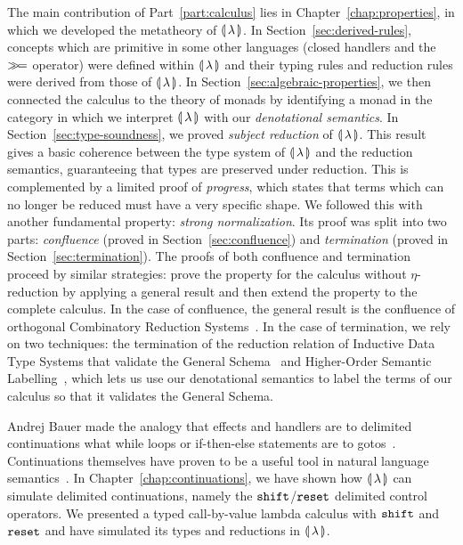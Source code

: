 The main contribution of Part~\ref{part:calculus} lies in
Chapter~\ref{chap:properties}, in which we developed the metatheory of
${\llparenthesis \, \lambda \, \rrparenthesis}$. In Section~\ref{sec:derived-rules}, concepts which are primitive
in some other languages (closed handlers and the $\mathbin{\gg\!=}$ operator) were
defined within ${\llparenthesis \, \lambda \, \rrparenthesis}$ and their typing rules and reduction rules were
derived from those of ${\llparenthesis \, \lambda \, \rrparenthesis}$. In Section~\ref{sec:algebraic-properties},
we then connected the calculus to the theory of monads by identifying a
monad in the category in which we interpret ${\llparenthesis \, \lambda \, \rrparenthesis}$ with our
\emph{denotational semantics}. In Section~\ref{sec:type-soundness}, we
proved \emph{subject reduction} of ${\llparenthesis \, \lambda \, \rrparenthesis}$. This result gives a basic
coherence between the type system of ${\llparenthesis \, \lambda \, \rrparenthesis}$ and the reduction semantics,
guaranteeing that types are preserved under reduction. This is complemented
by a limited proof of \emph{progress}, which states that terms which can no
longer be reduced must have a very specific shape. We followed this with
another fundamental property: \emph{strong normalization}. Its proof was
split into two parts: \emph{confluence} (proved in
Section~\ref{sec:confluence}) and \emph{termination} (proved in
Section~\ref{sec:termination}). The proofs of both confluence and
termination proceed by similar strategies: prove the property for the
calculus without $\eta$-reduction by applying a general result and then
extend the property to the complete calculus. In the case of confluence,
the general result is the confluence of orthogonal Combinatory Reduction
Systems~\cite{klop1993combinatory}. In the case of termination, we rely on
two techniques: the termination of the reduction relation of Inductive Data
Type Systems that validate the General Schema~\cite{blanqui2000termination}
and Higher-Order Semantic Labelling~\cite{hamana2007higher}, which lets us
use our denotational semantics to label the terms of our calculus so that
it validates the General Schema.

Andrej Bauer made the analogy that effects and handlers are to delimited
continuations what while loops or if-then-else statements are to
gotos~\cite{bauer2012lambda}. Continuations themselves have proven to be a
useful tool in natural language
semantics~\cite{de2001type,barker2002continuations,shan2005linguistic,de2006towards,barker2006continuations,barker2014continuations}. In
Chapter~\ref{chap:continuations}, we have shown how ${\llparenthesis \, \lambda \, \rrparenthesis}$ can simulate
delimited continuations, namely the $\mathtt{shift}$/$\mathtt{reset}$ delimited control
operators. We presented a typed call-by-value lambda calculus with $\mathtt{shift}$
and $\mathtt{reset}$ and have simulated its types and reductions in ${\llparenthesis \, \lambda \, \rrparenthesis}$.

